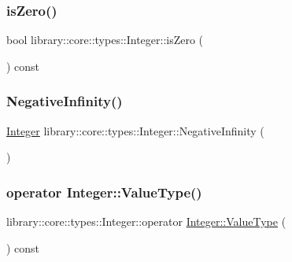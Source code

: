 \subsubsection{\texorpdfstring{is\+Zero()}{isZero()}}
{\footnotesize\ttfamily bool library\+::core\+::types\+::\+Integer\+::is\+Zero (\begin{DoxyParamCaption}{ }\end{DoxyParamCaption}) const}

\mbox{\label{classlibrary_1_1core_1_1types_1_1_integer_aa8151c3b615012ec215d20da6de593bd}} 
\subsubsection{\texorpdfstring{Negative\+Infinity()}{NegativeInfinity()}}
{\footnotesize\ttfamily \hyperlink{classlibrary_1_1core_1_1types_1_1_integer}{Integer} library\+::core\+::types\+::\+Integer\+::\+Negative\+Infinity (\begin{DoxyParamCaption}{ }\end{DoxyParamCaption})\hspace{0.3cm}{\ttfamily [static]}}

\mbox{\label{classlibrary_1_1core_1_1types_1_1_integer_ad1cf430796727e18440d50d4764b2792}} 
\subsubsection{\texorpdfstring{operator Integer\+::\+Value\+Type()}{operator Integer::ValueType()}}
{\footnotesize\ttfamily library\+::core\+::types\+::\+Integer\+::operator \hyperlink{classlibrary_1_1core_1_1types_1_1_integer_a623afb1580f870fd8a1997b1c12c917d}{Integer\+::\+Value\+Type} (\begin{DoxyParamCaption}{ }\end{DoxyParamCaption}) const}

